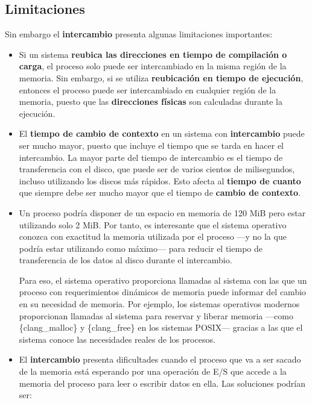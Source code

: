 \subsection{Limitaciones}\label{_limitaciones}

Sin embargo el \textbf{intercambio} presenta algunas limitaciones
importantes:

\begin{itemize}
\item
  Si un sistema \textbf{reubica las direcciones en tiempo de compilación
  o carga}, el proceso solo puede ser intercambiado en la misma región
  de la memoria. Sin embargo, si se utiliza \textbf{reubicación en
  tiempo de ejecución}, entonces el proceso puede ser intercambiado en
  cualquier región de la memoria, puesto que las \textbf{direcciones
  físicas} son calculadas durante la ejecución.
\item
  El \textbf{tiempo de cambio de contexto} en un sistema con
  \textbf{intercambio} puede ser mucho mayor, puesto que incluye el
  tiempo que se tarda en hacer el intercambio. La mayor parte del tiempo
  de intercambio es el tiempo de transferencia con el disco, que puede
  ser de varios cientos de milisegundos, incluso utilizando los discos
  más rápidos. Esto afecta al \textbf{tiempo de cuanto} que siempre debe
  ser mucho mayor que el tiempo de \textbf{cambio de contexto}.
\item
  Un proceso podría disponer de un espacio en memoria de 120 MiB pero
  estar utilizando solo 2 MiB. Por tanto, es interesante que el sistema
  operativo conozca con exactitud la memoria utilizada por el proceso
  ---y no la que podría estar utilizando como máximo--- para reducir el
  tiempo de transferencia de los datos al disco durante el intercambio.

  Para eso, el sistema operativo proporciona llamadas al sistema con las
  que un proceso con requerimientos dinámicos de memoria puede informar
  del cambio en su necesidad de memoria. Por ejemplo, los sistemas
  operativos modernos proporcionan llamadas al sistema para reservar y
  liberar memoria ---como \{clang\_malloc\} y \{clang\_free\} en los
  sistemas POSIX--- gracias a las que el sistema conoce las necesidades
  reales de los procesos.
\item
  El \textbf{intercambio} presenta dificultades cuando el proceso que va
  a ser sacado de la memoria está esperando por una operación de E/S que
  accede a la memoria del proceso para leer o escribir datos en ella.
  Las soluciones podrían ser:


\end{itemize}
